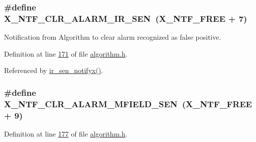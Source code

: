 \hypertarget{a00021_a55be0f14bd98010fdd4ff546f8cffefd}{
\subsubsection[{X\+\_\+\+N\+T\+F\+\_\+\+C\+L\+R\+\_\+\+A\+L\+A\+R\+M\+\_\+\+I\+R\+\_\+\+S\+E\+N}]{\setlength{\rightskip}{0pt plus 5cm}\#define X\+\_\+\+N\+T\+F\+\_\+\+C\+L\+R\+\_\+\+A\+L\+A\+R\+M\+\_\+\+I\+R\+\_\+\+S\+E\+N~({\bf X\+\_\+\+N\+T\+F\+\_\+\+F\+R\+E\+E} + 7)}}\label{a00021_a55be0f14bd98010fdd4ff546f8cffefd}


Notification from Algorithm to clear alarm recognized as false positive. 



Definition at line \hyperlink{a00021_source_l00171}{171} of file \hyperlink{a00021_source}{algorithm.\+h}.



Referenced by \hyperlink{a00045_source_l00141}{ir\+\_\+sen\+\_\+notifyx()}.

\hypertarget{a00021_af3da43bd9d885f9c2a69ece8f997891b}{
\subsubsection[{X\+\_\+\+N\+T\+F\+\_\+\+C\+L\+R\+\_\+\+A\+L\+A\+R\+M\+\_\+\+M\+F\+I\+E\+L\+D\+\_\+\+S\+E\+N}]{\setlength{\rightskip}{0pt plus 5cm}\#define X\+\_\+\+N\+T\+F\+\_\+\+C\+L\+R\+\_\+\+A\+L\+A\+R\+M\+\_\+\+M\+F\+I\+E\+L\+D\+\_\+\+S\+E\+N~({\bf X\+\_\+\+N\+T\+F\+\_\+\+F\+R\+E\+E} + 9)}}\label{a00021_af3da43bd9d885f9c2a69ece8f997891b}


Definition at line \hyperlink{a00021_source_l00177}{177} of file \hyperlink{a00021_source}{algorithm.\+h}.



